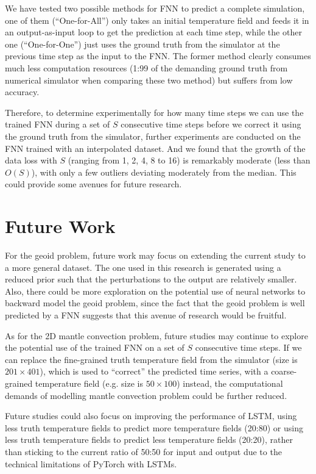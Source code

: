 We have tested two possible methods for FNN to predict a complete simulation, one of them (``One-for-All'') only takes an initial temperature field and feeds it in an output-as-input loop to get the prediction at each time step, while the other one (``One-for-One'') just uses the ground truth from the simulator at the previous time step as the input to the FNN. The former method clearly consumes much less computation resources (1:99 of the demanding ground truth from numerical simulator when comparing these two method) but suffers from low accuracy.

Therefore, to determine experimentally for how many time steps we can use the trained FNN during a set of $S$ consecutive time steps before we correct it using the ground truth from the simulator, further experiments are conducted on the FNN trained with an interpolated dataset. And we found that the growth of the data loss with $S$ (ranging from 1, 2, 4, 8 to 16) is remarkably moderate (less than $O(S)$), with only a few outliers deviating moderately from the median. This could provide some avenues for future research.

\section{Future Work}

For the geoid problem, future work may focus on extending the current study to a more general dataset. The one used in this research is generated using a reduced prior such that the perturbations to the output are relatively smaller. Also, there could be more exploration on the potential use of neural networks to backward model the geoid problem, since the fact that the geoid problem is well predicted by a FNN suggests that this avenue of research would be fruitful.

As for the 2D mantle convection problem, future studies may continue to explore the potential use of the trained FNN on a set of $S$ consecutive time steps. If we can replace the fine-grained truth temperature field from the simulator (size is $201 \times 401$), which is used to ``correct'' the predicted time series, with a coarse-grained temperature field (e.g. size is $50 \times 100$) instead, the computational demands of modelling mantle convection problem could be further reduced.

Future studies could also focus on improving the performance of LSTM, using less truth temperature fields to predict more temperature fields (20:80) or using less truth temperature fields to predict less temperature fields (20:20), rather than sticking to the current ratio of 50:50 for input and output due to the technical limitations of PyTorch with LSTMs.

